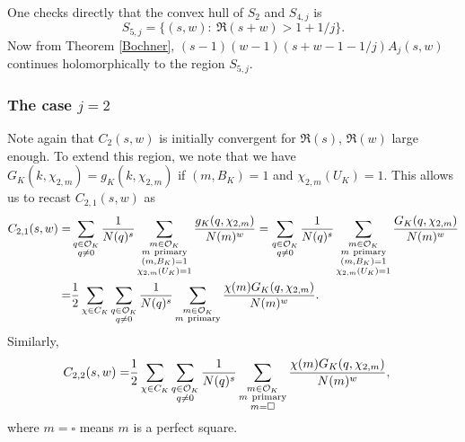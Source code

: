 \documentclass[twoside,leqno,10pt, A4]{amsart}
\begin{document}
  One checks directly that the convex hull of $S_2$ and $S_{4,j}$ is
\begin{equation*}
		S_{5,j}=\{(s,w):\ \Re(s+w)>1+ 1/j \}.
\end{equation*}
Now from Theorem \ref{Bochner}, $(s-1)(w-1)(s+w-1-1/j)A_j(s,w)$ continues holomorphically to the region $S_{5,j}$.

\subsubsection{\bf The case $j =2$}

Note again that $C_2(s,w)$ is initially convergent for $\Re(s)$, $\Re(w)$ large enough.  To extend this region, we note that we have
$G_K(k,\chi_{2, m}) =g_K(k,\chi_{2, m})$ if $(m, B_K)=1$ and $\chi_{2,m}(U_K) =1$. This allows us to recast $C_{2,1}(s,w)$ as
\begin{align}
\label{C1exp}
\begin{split}
  C_{2,1}(s,w)=& \sum_{\substack{q \in \mathcal O_K \\ q\neq 0}}\frac{1}{N(q)^s} \sum_{\substack{m \in \mathcal O_K \\ m \mathrm{\ primary} \\ (m, B_K)=1 \\ \chi_{2,m}(U_K) =1 }}\frac{g_K(q,\chi_{2,m})}{N(m)^w} = \sum_{\substack{q \in \mathcal O_K \\ q\neq 0}}\frac{1}{N(q)^s} \sum_{\substack{m \in \mathcal O_K \\ m \mathrm{\ primary} \\ (m, B_K)=1 \\ \chi_{2,m}(U_K) =1 }}\frac{G_K(q,\chi_{2,m})}{N(m)^w} \\
=& \frac {1}{2}\sum_{\chi \in C_K}\sum_{\substack{q \in \mathcal O_K \\ q\neq 0}}\frac{1}{N(q)^s} \sum_{\substack{m \in
\mathcal O_K \\ m \mathrm{\ primary}  }}\frac{\chi(m) G_K(q, \chi_{2,m})}{N(m)^w}.
\end{split}
\end{align}
  Similarly,
\begin{align}
\label{C21exp}
\begin{split}
  C_{2,2}(s,w)=& \frac {1}{2}\sum_{\chi \in C_K}\sum_{\substack{q \in \mathcal O_K \\ q\neq 0}}\frac{1}{N(q)^s} \sum_{\substack{m \in
\mathcal O_K \\ m \mathrm{\ primary} \\m = \square }}\frac{\chi(m) G_K(q, \chi_{2,m})}{N(m)^w},
\end{split}
\end{align}
where $m=\square$ means $m$ is a perfect square. \newline
\end{document}
